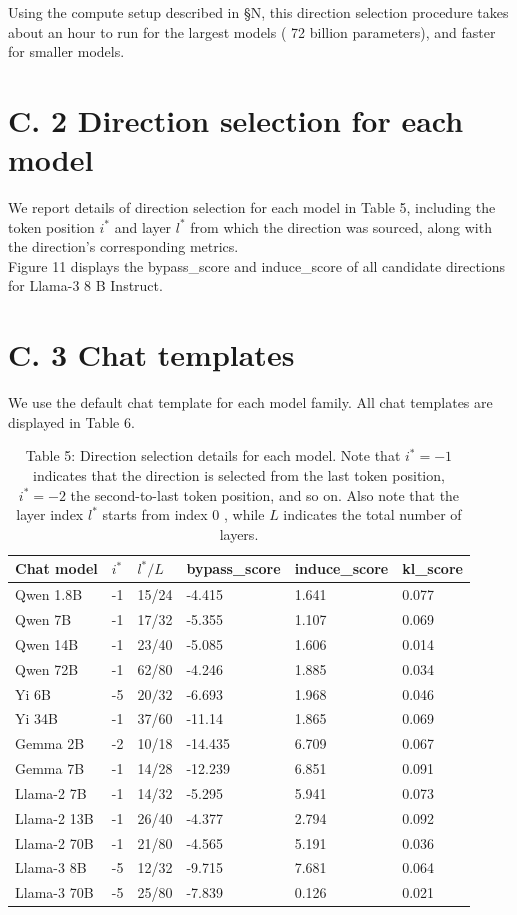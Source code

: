 \documentclass[10pt]{article}
\begin{document}
Using the compute setup described in §N, this direction selection procedure takes about an hour to run for the largest models ( 72 billion parameters), and faster for smaller models.

\section*{C. 2 Direction selection for each model}
We report details of direction selection for each model in Table 5, including the token position $i^{*}$ and layer $l^{*}$ from which the direction was sourced, along with the direction's corresponding metrics.\\
Figure 11 displays the bypass\_score and induce\_score of all candidate directions for Llama-3 8 B Instruct.

\section*{C. 3 Chat templates}
We use the default chat template for each model family. All chat templates are displayed in Table 6.

\begin{table}[h]
\begin{center}
\captionsetup{labelformat=empty}
\caption{Table 5: Direction selection details for each model. Note that $i^{*}=-1$ indicates that the direction is selected from the last token position, $i^{*}=-2$ the second-to-last token position, and so on. Also note that the layer index $l^{*}$ starts from index 0 , while $L$ indicates the total number of layers.}
\begin{tabular}{|l|l|l|l|l|l|}
\hline
Chat model & $i^{*}$ & $l^{*} / L$ & bypass\_score & induce\_score & kl\_score \\
\hline
Qwen 1.8B & -1 & 15/24 & -4.415 & 1.641 & 0.077 \\
\hline
Qwen 7B & -1 & 17/32 & -5.355 & 1.107 & 0.069 \\
\hline
Qwen 14B & -1 & 23/40 & -5.085 & 1.606 & 0.014 \\
\hline
Qwen 72B & -1 & 62/80 & -4.246 & 1.885 & 0.034 \\
\hline
Yi 6B & -5 & $20 / 32$ & -6.693 & 1.968 & 0.046 \\
\hline
Yi 34B & -1 & 37/60 & -11.14 & 1.865 & 0.069 \\
\hline
Gemma 2B & -2 & 10/18 & -14.435 & 6.709 & 0.067 \\
\hline
Gemma 7B & -1 & 14/28 & -12.239 & 6.851 & 0.091 \\
\hline
Llama-2 7B & -1 & 14/32 & -5.295 & 5.941 & 0.073 \\
\hline
Llama-2 13B & -1 & 26/40 & -4.377 & 2.794 & 0.092 \\
\hline
Llama-2 70B & -1 & 21/80 & -4.565 & 5.191 & 0.036 \\
\hline
Llama-3 8B & -5 & 12/32 & -9.715 & 7.681 & 0.064 \\
\hline
Llama-3 70B & -5 & 25/80 & -7.839 & 0.126 & 0.021 \\
\hline
\end{tabular}
\end{center}
\end{table}
\end{document}

